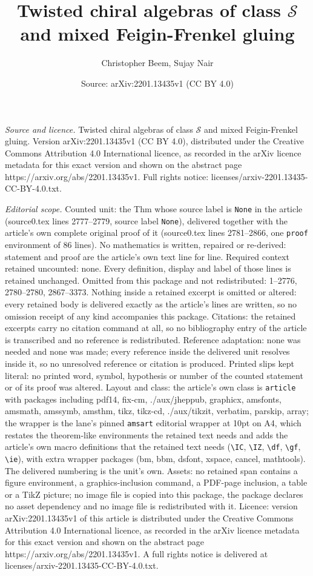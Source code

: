 \documentclass[10pt,a4paper]{amsart}
\title[Twisted chiral algebras of class $\mathcal{S}$ and mixed Fei]{Twisted chiral algebras of class $\mathcal{S}$ and mixed Feigin-Frenkel gluing}
\author{Christopher Beem, Sujay Nair}
\date{Source: arXiv:2201.13435v1 (CC BY 4.0)}
\begin{document}
\maketitle

\noindent\emph{Source and licence.} Twisted chiral algebras of class $\mathcal{S}$ and mixed Feigin-Frenkel gluing. Version arXiv:2201.13435v1 (CC BY 4.0), distributed under the Creative Commons Attribution 4.0 International licence, as recorded in the arXiv licence metadata for this exact version and shown on the abstract page https://arxiv.org/abs/2201.13435v1. Full rights notice: licenses/arxiv-2201.13435-CC-BY-4.0.txt.\par\smallskip

\noindent\textit{Editorial scope.} Counted unit: the Thm whose source label is \texttt{None} in the article (source0.tex lines 2777--2779, source label \texttt{None}), delivered together with the article's own complete original proof of it (source0.tex lines 2781--2866, one \texttt{proof} environment of 86 lines). No mathematics is written, repaired or re-derived: statement and proof are the article's own text line for line. Required context retained uncounted: none. Every definition, display and label of those lines is retained unchanged. Omitted from this package and not redistributed: 1--2776, 2780--2780, 2867--3373. Nothing inside a retained excerpt is omitted or altered: every retained body is delivered exactly as the article's lines are written, so no omission receipt of any kind accompanies this package. Citations: the retained excerpts carry no citation command at all, so no bibliography entry of the article is transcribed and no reference is redistributed. Reference adaptation: none was needed and none was made; every reference inside the delivered unit resolves inside it, so no unresolved reference or citation is produced. Printed slips kept literal: no printed word, symbol, hypothesis or number of the counted statement or of its proof was altered. Layout and class: the article's own class is \texttt{article} with packages including pdf14, fix-cm, ./aux/jheppub, graphicx, amsfonts, amsmath, amssymb, amsthm, tikz, tikz-cd, ./aux/tikzit, verbatim, parskip, array; the wrapper is the lane's pinned \texttt{amsart} editorial wrapper at 10pt on A4, which restates the theorem-like environments the retained text needs and adds the article's own macro definitions that the retained text needs (\texttt{\textbackslash IC}, \texttt{\textbackslash IZ}, \texttt{\textbackslash df}, \texttt{\textbackslash gf}, \texttt{\textbackslash ie}), with extra wrapper packages (bm, bbm, dsfont, xspace, cancel, mathtools). The delivered numbering is the unit's own. Assets: no retained span contains a figure environment, a graphics-inclusion command, a PDF-page inclusion, a table or a TikZ picture; no image file is copied into this package, the package declares no asset dependency and no image file is redistributed with it. Licence: version arXiv:2201.13435v1 of this article is distributed under the Creative Commons Attribution 4.0 International licence, as recorded in the arXiv licence metadata for this exact version and shown on the abstract page https://arxiv.org/abs/2201.13435v1. A full rights notice is delivered at licenses/arxiv-2201.13435-CC-BY-4.0.txt. 
\end{document}
